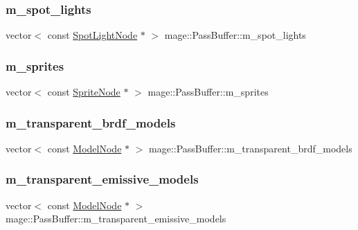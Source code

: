 \subsubsection{\texorpdfstring{m\+\_\+spot\+\_\+lights}{m\_spot\_lights}}
{\footnotesize\ttfamily vector$<$ const \hyperlink{namespacemage_aeed5dee4ff6c591eabb0e9114256df4a}{Spot\+Light\+Node} $\ast$ $>$ mage\+::\+Pass\+Buffer\+::m\+\_\+spot\+\_\+lights}

\hypertarget{structmage_1_1_pass_buffer_ad742ad6712a63e9d58621da83a7fb900}{}\label{structmage_1_1_pass_buffer_ad742ad6712a63e9d58621da83a7fb900} 
\subsubsection{\texorpdfstring{m\+\_\+sprites}{m\_sprites}}
{\footnotesize\ttfamily vector$<$ const \hyperlink{classmage_1_1_sprite_node}{Sprite\+Node} $\ast$ $>$ mage\+::\+Pass\+Buffer\+::m\+\_\+sprites}

\hypertarget{structmage_1_1_pass_buffer_a2697c5e89c8e654ada78cbf15f5e8067}{}\label{structmage_1_1_pass_buffer_a2697c5e89c8e654ada78cbf15f5e8067} 
\subsubsection{\texorpdfstring{m\+\_\+transparent\+\_\+brdf\+\_\+models}{m\_transparent\_brdf\_models}}
{\footnotesize\ttfamily vector$<$ const \hyperlink{classmage_1_1_model_node}{Model\+Node} $\ast$ $>$ mage\+::\+Pass\+Buffer\+::m\+\_\+transparent\+\_\+brdf\+\_\+models}

\hypertarget{structmage_1_1_pass_buffer_a6eeb7390dcdc25022e887ce110ff1fff}{}\label{structmage_1_1_pass_buffer_a6eeb7390dcdc25022e887ce110ff1fff} 
\subsubsection{\texorpdfstring{m\+\_\+transparent\+\_\+emissive\+\_\+models}{m\_transparent\_emissive\_models}}
{\footnotesize\ttfamily vector$<$ const \hyperlink{classmage_1_1_model_node}{Model\+Node} $\ast$ $>$ mage\+::\+Pass\+Buffer\+::m\+\_\+transparent\+\_\+emissive\+\_\+models}

